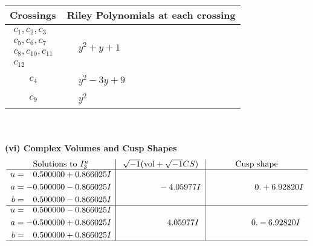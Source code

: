 \documentclass[1p]{elsarticle_modified}
\theoremstyle{definition}
\newcommand{\I}{\sqrt{-1}}
\begin{document}
\begin{tabular}{m{50pt}|m{274pt}}
Crossings & \hspace{64pt}Riley Polynomials at each crossing \\
\hline $$\begin{aligned}c_{1},c_{2},c_{3}\\c_{5},c_{6},c_{7}\\c_{8},c_{10},c_{11}\\c_{12}\end{aligned}$$&$\begin{aligned}
&y^2+y+1
\end{aligned}$\\
\hline $$\begin{aligned}c_{4}\end{aligned}$$&$\begin{aligned}
&y^2-3 y+9
\end{aligned}$\\
\hline $$\begin{aligned}c_{9}\end{aligned}$$&$\begin{aligned}
&y^2
\end{aligned}$\\
\hline
\end{tabular}\\~\\
\newpage\flushleft \textbf{(vi) Complex Volumes and Cusp Shapes}
$$\begin{array}{c|c|c}  
\text{Solutions to }I^u_{3}& \I (\text{vol} + \sqrt{-1}CS) & \text{Cusp shape}\\
 \hline 
\begin{aligned}
u &= \phantom{-}0.500000 + 0.866025 I \\
a &= -0.500000 - 0.866025 I \\
b &= \phantom{-}0.500000 - 0.866025 I\end{aligned}
 & \phantom{-0.000000 } -4.05977 I & \phantom{-0.000000 -}0. + 6.92820 I \\ \hline\begin{aligned}
u &= \phantom{-}0.500000 - 0.866025 I \\
a &= -0.500000 + 0.866025 I \\
b &= \phantom{-}0.500000 + 0.866025 I\end{aligned}
 & \phantom{-0.000000 -}4.05977 I & \phantom{-0.000000 } 0. - 6.92820 I\\
 \hline 
 \end{array}$$\newpage
\newpage\renewcommand{\arraystretch}{1}
\end{document}

